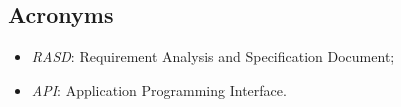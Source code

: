 \subsection{Acronyms}
	\begin{itemize}
	\item \textit{RASD}: Requirement Analysis and Specification Document;
	\item \textit{API}: Application Programming Interface.
	\end{itemize}